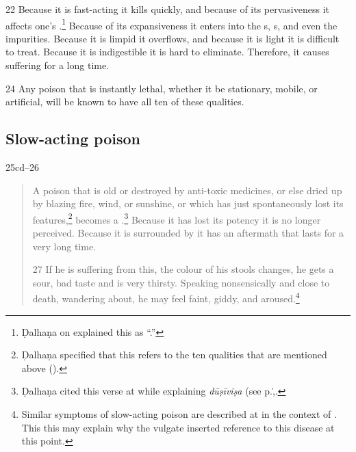 \begin{translation}
\item[22]
Because it is fast-acting it kills quickly, and because of its pervasiveness
it affects one's .\footnote{Ḍalhaṇa
on  explained this as “.”}  Because of its expansiveness it enters
into the s, s, and even the
impurities.  Because it is limpid it overflows, and
because it is light it is difficult to treat.  Because it is indigestible it
is hard to eliminate.  Therefore, it causes suffering for a long time.
    
    \item[ 24]
    Any poison that is instantly lethal, whether it be
    stationary, mobile, or artificial, will be known to 
    have all ten of these qualities.
    
    
  
    
    \subsection{Slow-acting poison}
    \item[25cd--26]  
    \begin{verse}
        A poison that is old or destroyed by anti-toxic medicines, or
else dried up by blazing fire, wind, or sunshine, or which has
just spontaneously lost its features,\footnote{Ḍalhaṇa
    specified that this refers to the ten qualities that are
    mentioned above ().} becomes a
    .\footnote{Ḍalhaṇa cited
        this verse at  while explaining
        \emph{dūṣīviṣa} (see p.\.,\pageref{dusivisa}.} Because it has
        lost its potency it is no longer perceived.  Because it is
        surrounded by  it has an aftermath that
        lasts for a very long time.
        
        \item[27] If he is suffering from this, the colour of his stools changes,
he gets a sour, bad taste and is very thirsty. Speaking nonsensically 
and close
to death, wandering about, he may feel faint, giddy, and
aroused.\footnote{Similar symptoms of slow-acting poison are described at
 in the context of  .  This this may explain why the vulgate inserted reference to this
disease at this point.}
        
        
        

\end{verse}
\end{translation}
